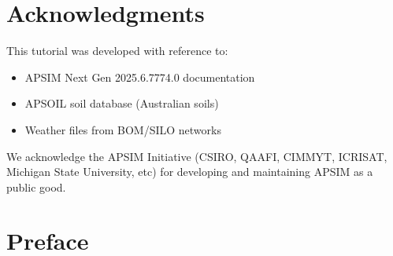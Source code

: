 \date{May 2026 \\ Version 1.0}




\frontmatter

\maketitle


\chapter*{Acknowledgments}

This tutorial was developed with reference to:
\begin{itemize}
  \item APSIM Next Gen 2025.6.7774.0 documentation
  \item APSOIL soil database (Australian soils)
  \item Weather files from BOM/SILO networks
\end{itemize}

We acknowledge the APSIM Initiative (CSIRO, QAAFI, CIMMYT, ICRISAT, Michigan State University, etc) for developing and maintaining APSIM as a public good.


\tableofcontents
\listoffigures
\listoftables


\chapter*{Preface}

